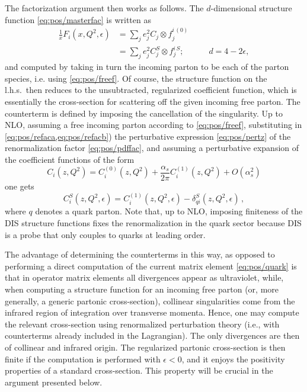 The factorization argument then works as follows. The $d$-dimensional structure
function \cref{eq:pos/masterfac} is
written as
\begin{align} \label{eq:pos/refaca}
 \frac{1}{x} F_i(x,Q^2,\epsilon)&=\sum_{j} e^2_j C_j \otimes f_j^{i\,(0)} \\
&=\sum_{j} e^2_j C_j^S \otimes f_j^{i\,S};\qquad\quad d=4-2\epsilon,
\label{eq:pos/refacb}
\end{align}
and computed by taking in turn  the incoming parton to be each of the
parton species, i.e. using \cref{eq:pos/freef}.
  Of course, the structure
function on the l.h.s.\ then reduces to the
unsubtracted, regularized coefficient
function, which is essentially the cross-section for scattering off
the given incoming free parton. The counterterm is defined by imposing the
cancellation of the singularity. Up to NLO, assuming a free incoming
parton according to \cref{eq:pos/freef}, substituting in
\cref{eq:pos/refaca,eq:pos/refacb}) the
perturbative expression \cref{eq:pos/pertz} of the 
renormalization factor \cref{eq:pos/pdffac}, and assuming a
perturbative expansion of the coefficient functions of the form
\begin{equation}\label{eq:pos/perc}
  C_i(z,Q^2)= C^{(0)}_i(z,Q^2)+\frac{\alpha_s}{2\pi} C^{(1)}_i(z,Q^2)+O(\alpha_s^2)
\end{equation} 
one gets
\begin{equation}\label{eq:pos/renorm}
    C_i^S(z,Q^2,\epsilon) = 
    {C^{(1)}_{i}}(z,Q^2,\epsilon)
    -\delta_{qi}^S(z,Q^2,\epsilon)\,,
\end{equation}
where $q$ denotes a quark parton.
Note that, up to NLO, imposing finiteness of the DIS structure
functions fixes the renormalization in the quark sector because DIS is
a probe that only couples to quarks at leading order.

The advantage of determining the counterterms in this way, as opposed
to performing a direct computation of the current matrix element
\cref{eq:pos/quark} is that in  operator matrix
elements all divergences appear as ultraviolet, while, when computing a
structure function for an incoming free parton  (or, more
generally, a generic partonic cross-section), collinear singularities
come from the infrared region of integration over
transverse momenta. Hence, one may compute the relevant
cross-section using renormalized perturbation theory (i.e., with
counterterms already included in the Lagrangian). The only divergences
are then of collinear and infrared origin.
The regularized partonic cross-section is
then finite if the computation is
performed with $\epsilon<0$, and it enjoys the positivity
properties of a standard 
cross-section. This property will be crucial in the argument presented
 below.


